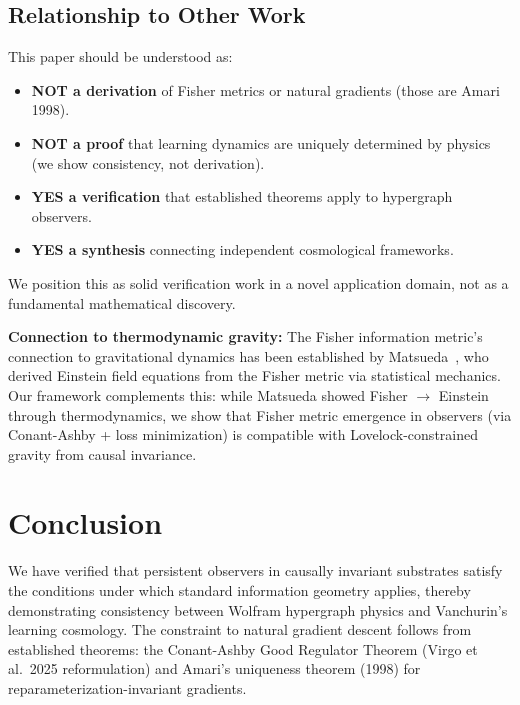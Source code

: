 \documentclass[11pt,a4paper]{article}
\theoremstyle{plain}
\theoremstyle{definition}
\theoremstyle{remark}
\begin{document}
\subsection{Relationship to Other Work}

This paper should be understood as:
\begin{itemize}[noitemsep]
\item \textbf{NOT a derivation} of Fisher metrics or natural gradients (those are Amari 1998).
\item \textbf{NOT a proof} that learning dynamics are uniquely determined by physics (we show consistency, not derivation).
\item \textbf{YES a verification} that established theorems apply to hypergraph observers.
\item \textbf{YES a synthesis} connecting independent cosmological frameworks.
\end{itemize}

We position this as solid verification work in a novel application domain, not as a fundamental mathematical discovery.

\textbf{Connection to thermodynamic gravity:} The Fisher information metric's connection to gravitational dynamics has been established by Matsueda~\cite{matsueda2013emergent}, who derived Einstein field equations from the Fisher metric via statistical mechanics. Our framework complements this: while Matsueda showed Fisher $\to$ Einstein through thermodynamics, we show that Fisher metric emergence in observers (via Conant-Ashby + loss minimization) is compatible with Lovelock-constrained gravity from causal invariance.

\section{Conclusion}
\label{sec:conclusion}

We have verified that persistent observers in causally invariant substrates satisfy the conditions under which standard information geometry applies, thereby demonstrating consistency between Wolfram hypergraph physics and Vanchurin's learning cosmology. The constraint to natural gradient descent follows from established theorems: the Conant-Ashby Good Regulator Theorem (Virgo et al.~2025 reformulation) and Amari's uniqueness theorem (1998) for reparameterization-invariant gradients.
\end{document}
